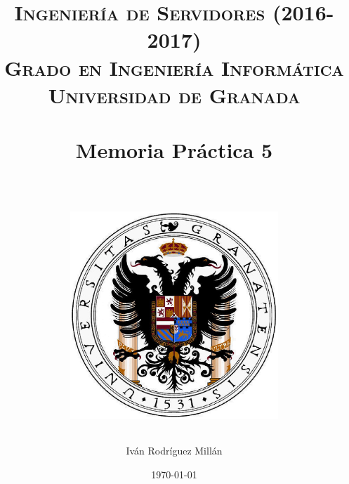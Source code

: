 


\title{	
\normalfont \normalsize 
\textsc{\textbf{Ingeniería de Servidores (2016-2017)} \\ Grado en Ingeniería Informática \\ Universidad de Granada} \\ [25pt] %
\horrule{0.5pt} \\[0.4cm] %
\huge Memoria Práctica 5 \\ %
\horrule{2pt} \\[0.5cm] %
\begin{figure}[!ht]
	\begin{center}
		\includegraphics[width=0.7\textwidth]{imagenes/escudo-de-la-universidad-de-granada}
	\end{center}
\end{figure}
}

\author{Iván Rodríguez Millán} %

\date{\normalsize\today} %




